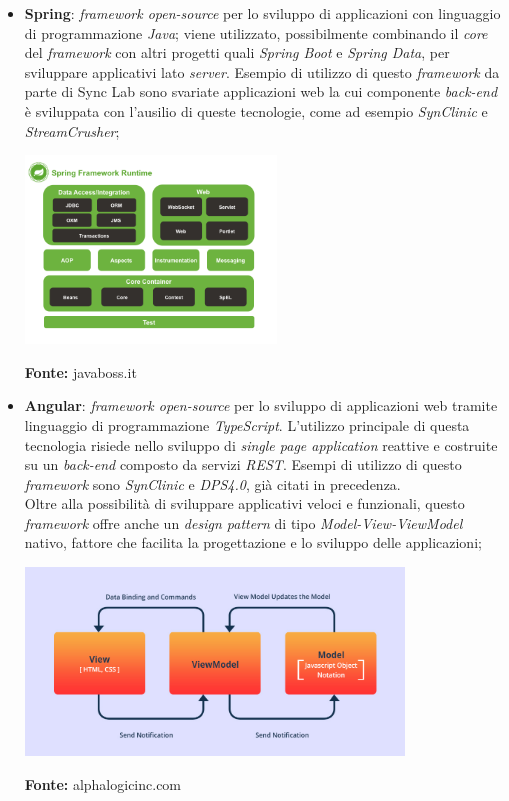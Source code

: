 \begin{itemize}
  \item \textbf{Spring}: \textit{framework open-source} per lo sviluppo di applicazioni con linguaggio di programmazione \textit{Java}; viene utilizzato, possibilmente combinando il \textit{core} del \textit{framework} con altri progetti quali \textit{Spring Boot} e \textit{Spring Data}, per sviluppare applicativi lato \textit{server}. Esempio di utilizzo di questo \textit{framework} da parte di Sync Lab sono svariate applicazioni web la cui componente \textit{back-end} è sviluppata con l'ausilio di queste tecnologie, come ad esempio \textit{SynClinic} e \textit{StreamCrusher};

  \begin{minipage}{\linewidth}
    \centering
      \includegraphics[height=5cm]{immagini/spring}
    \caption*{\textbf{Fonte:} javaboss.it}
  \end{minipage}

  \item \textbf{Angular}: \textit{framework open-source} per lo sviluppo di applicazioni web tramite linguaggio di programmazione \textit{TypeScript}. L'utilizzo principale di questa tecnologia risiede nello sviluppo di \textit{single page application} reattive e costruite su un \textit{back-end} composto da servizi \textit{REST}. Esempi di utilizzo di questo \textit{framework} sono \textit{SynClinic} e \textit{DPS4.0}, già citati in precedenza. \\
  Oltre alla possibilità di sviluppare applicativi veloci e funzionali, questo \textit{framework} offre anche un \textit{design pattern} di tipo \textit{Model-View-ViewModel} nativo, fattore che facilita la progettazione e lo sviluppo delle applicazioni;

  \begin{minipage}{\linewidth}
    \centering
      \includegraphics[height=5cm]{immagini/angular}
    \caption*{\textbf{Fonte:} alphalogicinc.com}
  \end{minipage}


\end{itemize}
